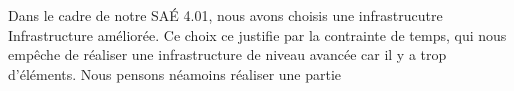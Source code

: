 \documentclass[../Livrable1.tex]{subfiles}
\begin{document}
Dans le cadre de notre SAÉ 4.01, nous avons choisis une infrastrucutre Infrastructure améliorée.
Ce choix ce justifie par la contrainte de temps, qui nous empêche de réaliser une infrastructure de 
niveau avancée car il y a trop d'éléments. Nous pensons néamoins réaliser une partie 
\end{document}
